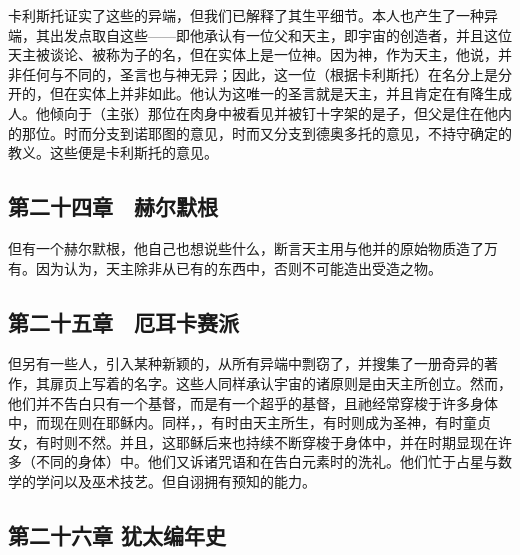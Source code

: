 卡利斯托证实了这些的异端，但我们已解释了其生平细节。\newline{}本人也产生了一种异端，其出发点取自这些——即他承认有一位父和天主，即宇宙的创造者，并且这位天主被谈论、被称为子的名，但在实体上是一位神。因为神，作为天主，他说，并非任何与不同的，圣言也与神无异；因此，这一位（根据卡利斯托）在名分上是分开的，但在实体上并非如此。他认为这唯一的圣言就是天主，并且肯定在有降生成人。他倾向于（主张）那位在肉身中被看见并被钉十字架的是子，但父是住在他内的那位。时而分支到诺耶图的意见，时而又分支到德奥多托的意见，不持守确定的教义。这些便是卡利斯托的意见。\par


\subsection{第二十四章　赫尔默根}

但有一个赫尔默根，他自己也想说些什么，断言天主用与他并的原始物质造了万有。因为认为，天主除非从已有的东西中，否则不可能造出受造之物。\par


\subsection{第二十五章　厄耳卡赛派}

但另有一些人，引入某种新颖的，从所有异端中剽窃了，并搜集了一册奇异的著作，其扉页上写着的名字。这些人同样承认宇宙的诸原则是由天主所创立。然而，他们并不告白只有一个基督，而是有一个超乎的基督，且祂经常穿梭于许多身体中，而现在则在耶稣内。同样，，有时由天主所生，有时则成为圣神，有时童贞女，有时则不然。并且，这耶稣后来也持续不断穿梭于身体中，并在时期显现在许多（不同的身体）中。他们又诉诸咒语和在告白元素时的洗礼。他们忙于占星与数学的学问以及巫术技艺。但自诩拥有预知的能力。\par


\subsection{第二十六章 犹太编年史}

